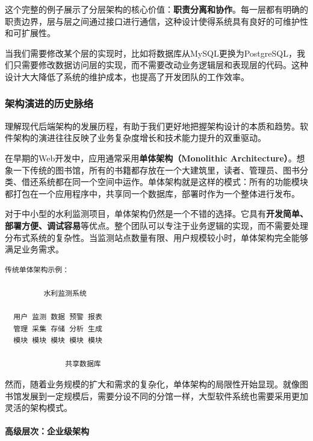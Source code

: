 这个完整的例子展示了分层架构的核心价值：\textbf{职责分离和协作}。每一层都有明确的职责边界，层与层之间通过接口进行通信，这种设计使得系统具有良好的可维护性和可扩展性。

当我们需要修改某个层的实现时，比如将数据库从MySQL更换为PostgreSQL，我们只需要修改数据访问层的实现，而不需要改动业务逻辑层和表现层的代码。这种设计大大降低了系统的维护成本，也提高了开发团队的工作效率。

\subsubsection{架构演进的历史脉络}\label{ux67b6ux6784ux6f14ux8fdbux7684ux5386ux53f2ux8109ux7edc}

理解现代后端架构的发展历程，有助于我们更好地把握架构设计的本质和趋势。软件架构的演进往往反映了业务复杂度增长和技术能力提升的双重驱动。

在早期的Web开发中，应用通常采用\textbf{单体架构（Monolithic Architecture）}。想象一下传统的图书馆，所有的书籍都存放在一个大建筑里，读者、管理员、图书分类、借还系统都在同一个空间中运作。单体架构就是这样的模式：所有的功能模块都打包在一个应用程序中，共享同一个数据库，部署时作为一个整体进行发布。

对于中小型的水利监测项目，单体架构仍然是一个不错的选择。它具有\textbf{开发简单、部署方便、调试容易}等优点。整个团队可以专注于业务逻辑的实现，而不需要处理分布式系统的复杂性。当监测站点数量有限、用户规模较小时，单体架构完全能够满足业务需求。

\begin{verbatim}
传统单体架构示例：

         水利监测系统                
      
  用户 监测 数据 预警 报表     
  管理 采集 存储 分析 生成     
  模块 模块 模块 模块 模块     
      
              共享数据库              
\end{verbatim}

然而，随着业务规模的扩大和需求的复杂化，单体架构的局限性开始显现。就像图书馆发展到一定规模后，需要分设不同的分馆一样，大型软件系统也需要采用更加灵活的架构模式。

\paragraph{高级层次：企业级架构}\label{ux9ad8ux7ea7ux5c42ux6b21ux4f01ux4e1aux7ea7ux67b6ux6784}

